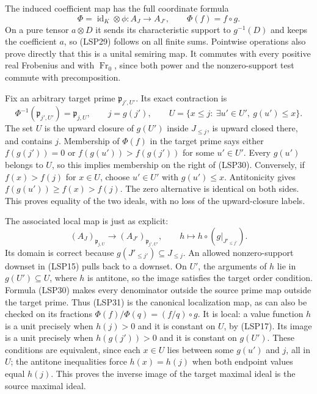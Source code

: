 The induced coefficient map has the full coordinate formula
\begin{equation}\tag{LSP29}
 \Phi=\operatorname{id}_K\otimes\phi:A_J\longrightarrow A_{J'},
 \qquad \Phi(f)=f\circ g.
\end{equation}
On a pure tensor $a\otimes D$ it sends its characteristic support
to $g^{-1}(D)$ and keeps the coefficient $a$, so (LSP29) follows
on all finite sums. Pointwise operations also prove directly that
this is a unital semiring map. It commutes with every positive real
Frobenius and with $\operatorname{Fr}_0$, since both power and
the nonzero-support test commute with precomposition.

Fix an arbitrary target prime $\mathfrak p_{j',U'}$. Its exact
contraction is
\begin{equation}\tag{LSP30}
 \Phi^{-1}(\mathfrak p_{j',U'})=\mathfrak p_{j,U},
 \qquad j=g(j'),\qquad
 U=\{x\le j:\ \exists u'\in U',\ g(u')\le x\}.
\end{equation}
The set $U$ is the upward closure of $g(U')$ inside $J_{\le j}$,
is upward closed there, and contains $j$. Membership of $\Phi(f)$
in the target prime says either $f(g(j'))=0$ or
$f(g(u'))>f(g(j'))$ for some $u'\in U'$. Every $g(u')$ belongs
to $U$, so this implies membership on the right of (LSP30).
Conversely, if $f(x)>f(j)$ for $x\in U$, choose $u'\in U'$
with $g(u')\le x$. Antitonicity gives
$f(g(u'))\ge f(x)>f(j)$. The zero alternative is identical on
both sides. This proves equality of the two ideals, with no loss
of the upward-closure labels.

The associated local map is just as explicit:
\begin{equation}\tag{LSP31}
 (A_J)_{\mathfrak p_{j,U}}\longrightarrow
 (A_{J'})_{\mathfrak p_{j',U'}},\qquad
 h\longmapsto h\circ(g|_{J'_{\le j'}}).
\end{equation}
Its domain is correct because $g(J'_{\le j'})\subseteq J_{\le j}$.
An allowed nonzero-support downset in (LSP15) pulls back to a
downset. On $U'$, the arguments of $h$ lie in $g(U')\subseteq U$,
where $h$ is antitone, so the image satisfies the target order
condition. Formula (LSP30) makes every denominator outside the
source prime map outside the target prime. Thus (LSP31) is the
canonical localization map, as can also be checked on its fractions
$\Phi(f)/\Phi(q)=(f/q)\circ g$. It is local: a value function
$h$ is a unit precisely when $h(j)>0$ and it is constant on $U$,
by (LSP17). Its image is a unit precisely when $h(g(j'))>0$ and
it is constant on $g(U')$. These conditions are equivalent, since
each $x\in U$ lies between some $g(u')$ and $j$, all in $U$;
the antitone inequalities force $h(x)=h(j)$ when both endpoint
values equal $h(j)$. This proves the inverse image of the target
maximal ideal is the source maximal ideal.

